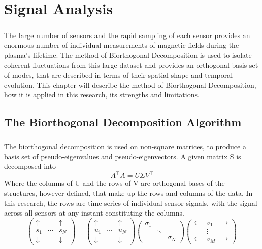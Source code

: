 \chapter{Signal Analysis}
\paragraph{}  The large number of sensors and the rapid sampling of each sensor provides an enormous number of individual measurements of magnetic fields during the plasma's lifetime. The method of Biorthogonal Decomposition is used to isolate coherent fluctuations from this large dataset and provides an orthogonal basis set of modes, that are described in terms of their spatial shape and temporal evolution.  This chapter will describe the method of Biorthogonal Decomposition, how it is applied in this research, its strengths and limitations.

\section{The Biorthogonal Decomposition Algorithm}
\paragraph{}
The biorthogonal decomposition is used on non-square matrices, to produce a basis set of pseudo-eigenvalues and pseudo-eigenvectors.  A given matrix S is decomposed into 
\begin{equation}
A^{\intercal} A = U \Sigma V^{\intercal}
\end{equation}
Where the columns of U and the rows of V are orthogonal bases of the structures, however defined, that make up the rows and columns of the data. In this research, the rows are time series of individual sensor signals, with the signal across all sensors at any instant constituting the columns.  
$$
\begin{pmatrix}
\uparrow& &\uparrow\\
s_1&\cdots&s_N\\
\downarrow & &\downarrow
\end{pmatrix}
 =
\begin{pmatrix}
\uparrow& &\uparrow\\
u_1&\cdots&u_N\\
\downarrow & &\downarrow
\end{pmatrix}
\begin{pmatrix}
\sigma_1& &\\
&\ddots&\\
& &\sigma_N
\end{pmatrix}
\begin{pmatrix}
\leftarrow& v_1&\rightarrow\\
&\vdots&\\
\leftarrow& v_M &\rightarrow
\end{pmatrix}
$$



